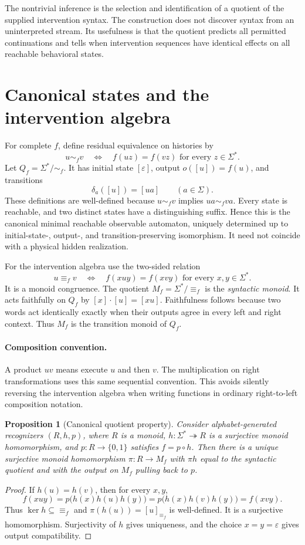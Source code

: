 \documentclass[11pt]{article}
\newtheorem{proposition}[theorem]{Proposition}
\theoremstyle{remark}
\newcommand{\eps}{\varepsilon}
\begin{document}
The nontrivial inference is the selection and identification of a quotient of the supplied intervention syntax. The construction does not discover syntax from an uninterpreted stream. Its usefulness is that the quotient predicts all permitted continuations and tells when intervention sequences have identical effects on all reachable behavioral states.

\section{Canonical states and the intervention algebra}
\label{sec:canonical}

For complete $f$, define residual equivalence on histories by
\[
 u\sim_f v
 \quad\Longleftrightarrow\quad
 f(uz)=f(vz)\text{ for every }z\in\Sigma^*.
\]
Let $Q_f=\Sigma^*/{\sim_f}$. It has initial state $[\eps]$, output $o([u])=f(u)$, and transitions
\[
 \delta_a([u])=[ua]\qquad(a\in\Sigma).
\]
These definitions are well-defined because $u\sim_f v$ implies $ua\sim_f va$. Every state is reachable, and two distinct states have a distinguishing suffix. Hence this is the canonical minimal reachable observable automaton, uniquely determined up to initial-state-, output-, and transition-preserving isomorphism. It need not coincide with a physical hidden realization.

For the intervention algebra use the two-sided relation
\[
 u\equiv_f v
 \quad\Longleftrightarrow\quad
 f(xuy)=f(xvy)\text{ for every }x,y\in\Sigma^*.
\]
It is a monoid congruence. The quotient $M_f=\Sigma^*/{\equiv_f}$ is the \emph{syntactic monoid}. It acts faithfully on $Q_f$ by $[x]\cdot[u]=[xu]$. Faithfulness follows because two words act identically exactly when their outputs agree in every left and right context. Thus $M_f$ is the transition monoid of $Q_f$.

\paragraph{Composition convention.}
A product $uv$ means execute $u$ and then $v$. The multiplication on right transformations uses this same sequential convention. This avoids silently reversing the intervention algebra when writing functions in ordinary right-to-left composition notation.

\begin{proposition}[Canonical quotient property]
\label{prop:syntactic}
Consider alphabet-generated recognizers $(R,h,p)$, where $R$ is a monoid, $h:\Sigma^*\twoheadrightarrow R$ is a surjective monoid homomorphism, and $p:R\to\{0,1\}$ satisfies $f=p\circ h$. Then there is a unique surjective monoid homomorphism $\pi:R\to M_f$ with $\pi h$ equal to the syntactic quotient and with the output on $M_f$ pulling back to $p$.
\end{proposition}
\begin{proof}
If $h(u)=h(v)$, then for every $x,y$,
\[
 f(xuy)=p\bigl(h(x)h(u)h(y)\bigr)
       =p\bigl(h(x)h(v)h(y)\bigr)=f(xvy).
\]
Thus $\ker h\subseteq{\equiv_f}$ and $\pi(h(u))=[u]_{\equiv_f}$ is well-defined. It is a surjective homomorphism. Surjectivity of $h$ gives uniqueness, and the choice $x=y=\eps$ gives output compatibility.
\end{proof}
\end{document}
